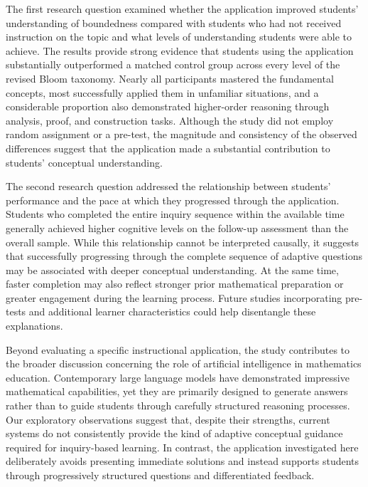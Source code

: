 \documentclass[11pt]{article}
\begin{document}
The first research question examined whether the application improved students' understanding of boundedness compared with students who had not received instruction on the topic and what levels of understanding students were able to achieve. The results provide strong evidence that students using the application substantially outperformed a matched control group across every level of the revised Bloom taxonomy. Nearly all participants mastered the fundamental concepts, most successfully applied them in unfamiliar situations, and a considerable proportion also demonstrated higher-order reasoning through analysis, proof, and construction tasks. Although the study did not employ random assignment or a pre-test, the magnitude and consistency of the observed differences suggest that the application made a substantial contribution to students' conceptual understanding.

The second research question addressed the relationship between students' performance and the pace at which they progressed through the application. Students who completed the entire inquiry sequence within the available time generally achieved higher cognitive levels on the follow-up assessment than the overall sample. While this relationship cannot be interpreted causally, it suggests that successfully progressing through the complete sequence of adaptive questions may be associated with deeper conceptual understanding. At the same time, faster completion may also reflect stronger prior mathematical preparation or greater engagement during the learning process. Future studies incorporating pre-tests and additional learner characteristics could help disentangle these explanations.

Beyond evaluating a specific instructional application, the study contributes to the broader discussion concerning the role of artificial intelligence in mathematics education. Contemporary large language models have demonstrated impressive mathematical capabilities, yet they are primarily designed to generate answers rather than to guide students through carefully structured reasoning processes. Our exploratory observations suggest that, despite their strengths, current systems do not consistently provide the kind of adaptive conceptual guidance required for inquiry-based learning. In contrast, the application investigated here deliberately avoids presenting immediate solutions and instead supports students through progressively structured questions and differentiated feedback.
\end{document}
